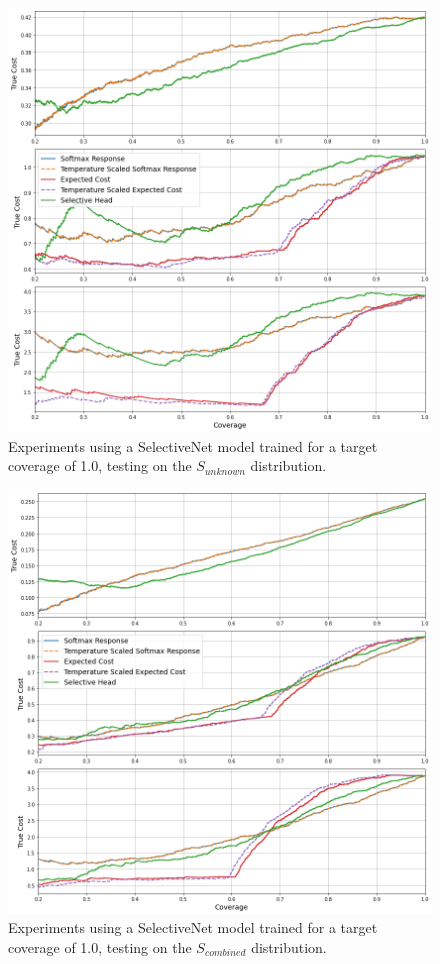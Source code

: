 \begin{figure}[H]
	\includegraphics[width=\textwidth]{images/binary/sn1.0_out_distribution.png}
	\caption*{Experiments using a SelectiveNet model trained for a target coverage of 1.0, testing on the $S_{unknown}$ distribution.}
\end{figure}

\begin{figure}[H]
	\includegraphics[width=\textwidth]{images/binary/sn1.0_combine_distribution.png}
	\caption*{Experiments using a SelectiveNet model trained for a target coverage of 1.0, testing on the $S_{combined}$ distribution.}
\end{figure}

